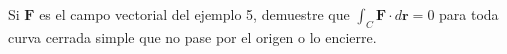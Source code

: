 \item Si $\mathbf{F}$ es el campo vectorial del ejemplo 5, demuestre que $\int_C \mathbf{F} \cdot d\mathbf{r} = 0$ para toda curva cerrada simple que no pase por el origen o lo encierre.
